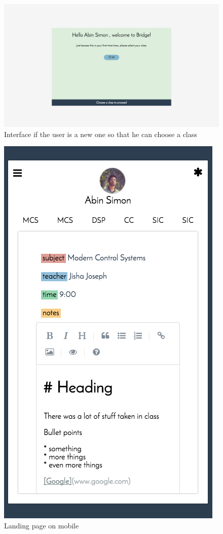\documentclass{article}
\begin{document}
\begin{figure}
  \includegraphics[width=\linewidth]{newuserpopup.png}
  \caption{Interface if the user is a new one so that he can choose a class}
\end{figure}

\begin{figure}
  \includegraphics[width=\linewidth]{mobilelanding.png}
  \caption{Landing page on mobile}
\end{figure}
\end{document}
